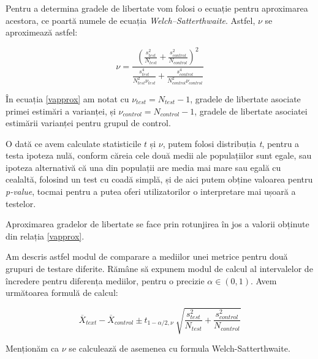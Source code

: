 \vspace{0.8cm}

Pentru a determina gradele de libertate vom folosi o ecuație pentru aproximarea acestora, ce poartă numele de ecuația \textit{Welch–Satterthwaite}\cite{Welch1947}. Astfel, $\nu$ se aproximează astfel:

\begin{equation}
\label{vapprox}
\nu = \frac{({\frac{s_{test}^2}{N_{test}} }+ {\frac{s_{control}^2}{N_{control}}}) ^ 2}{
	\frac{s_{test}^4}{N_{test}^2 \nu_{test}} + 
	\frac{s_{control}^4}{N_{control}^2 \nu_{control}}
}
\end{equation}

\vspace{0.8cm}

În ecuația \ref{vapprox} am notat cu $\nu_{test} = N_{test} - 1$, gradele de libertate asociate primei estimări a varianței,  și $\nu_{control} = N_{control} - 1$, gradele de libertate asociatei estimării varianței pentru grupul de control.

O dată ce avem calculate statisticile $t$ și $\nu$, putem folosi distribuția \textit{t}, pentru a testa ipoteza nulă, conform căreia cele două medii ale populațiilor sunt egale, sau ipoteza alternativă că una din populații are media mai mare sau egală cu cealaltă, folosind un test cu coadă simplă, și de aici putem obține valoarea pentru \textit{p-value}, tocmai pentru a putea oferi utilizatorilor o interpretare mai ușoară a testelor.

\begin{remark}
	Aproximarea gradelor de libertate se face prin rotunjirea în jos a valorii obținute din relația \ref{vapprox}.
\end{remark}

Am descris astfel modul de comparare a mediilor unei metrice pentru două grupuri de testare diferite. Rămâne să expunem modul de calcul al intervalelor de încredere pentru diferența mediilor, pentru o precizie $\alpha \in (0, 1)$. Avem următoarea formulă de calcul: \cite{miao}

\begin{equation}
\overline{X}_{text} - \overline{X}_{control} \pm t_{1 - \alpha/2, \nu} \
\sqrt{ {\frac{s_{test}^2}{N_{test}} }+ {\frac{s_{control}^2}{N_{control}}}}
\end{equation}

\vspace{0.8cm}

Menționăm ca $\nu$ se calculează de asemenea cu formula Welch-Satterthwaite.

